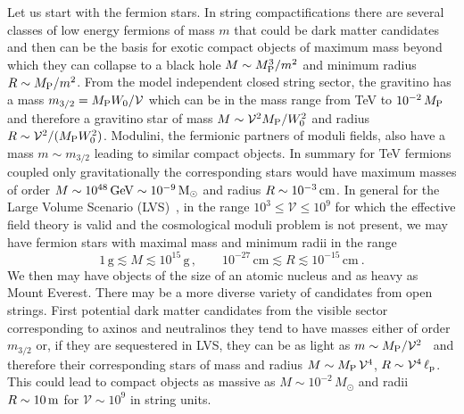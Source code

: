 \documentclass[11pt,a4paper]{article}
\newcommand{\be}{\begin{equation}}
\newcommand{\ee}{\end{equation}}
\newcommand{\V}{\mathcal{V}}
\begin{document}
Let us start with the fermion stars. In string compactifications there are several classes of low energy fermions of mass $m$ that could be dark matter candidates and then can be the basis for exotic compact objects of maximum mass beyond which they can collapse to a black hole $M\sim M_{\rm P}^3/m^2$ and minimum radius $R\sim M_{\rm P}/m^2$. From the model independent closed string sector, the gravitino has a mass $m_{3/2}=M_{\rm P} W_0/\V$ which can be in the mass range from TeV to $10^{-2}\, M_{\rm P}$ and therefore a gravitino star of mass $M\sim \V^2 M_{\rm P}/W_0^2$ and radius $R\sim \V^2/(M_{\rm P}W_0^2)$.  Modulini, the fermionic partners of moduli fields, also have a mass $m\sim m_{3/2}$ leading to similar compact objects. In summary for TeV fermions coupled only gravitationally the corresponding stars would have maximum masses of order $M\sim 10^{48} \,\rm{GeV}\sim 10^{-9} \,M_\odot$ and radius $R\sim 10^{-3} \,\rm{cm}$.  In general for the Large Volume Scenario (LVS)~\cite{Balasubramanian:2005zx,Conlon:2005ki}, in the range $10^3\leq \V\leq 10^9$ for which the effective field theory is valid and the cosmological moduli problem is not present, we may have fermion stars with maximal mass and minimum radii in the range
\be
1 \,\text{g} \lesssim M\lesssim 10^{15} \, \text{g}\,, \qquad 10^{-27}\, \text{cm} \lesssim R \lesssim 10^{-15} \,\text{cm}~.
\ee
We then may have objects of the size of an atomic nucleus and as heavy as Mount Everest. There may be a more diverse variety of candidates from open strings. First potential dark matter candidates from the visible sector corresponding to axinos and neutralinos they tend to have masses either of order $m_{3/2}$ or, if they are sequestered in LVS, they can be as light as $m\sim M_{\rm P}/\V^2$~\cite{Blumenhagen:2009gk} and therefore their corresponding stars of mass and radius $M\sim M_{\rm P}\,\V^4$,  $R\sim \V^4\, \ell_{\rm p}$. This could lead to compact objects as massive as $M\sim 10^{-2} \,M_\odot  $ and radii $R\sim 10 \, \rm m$ for $\V\sim 10^9$ in string units. \\
\end{document}
